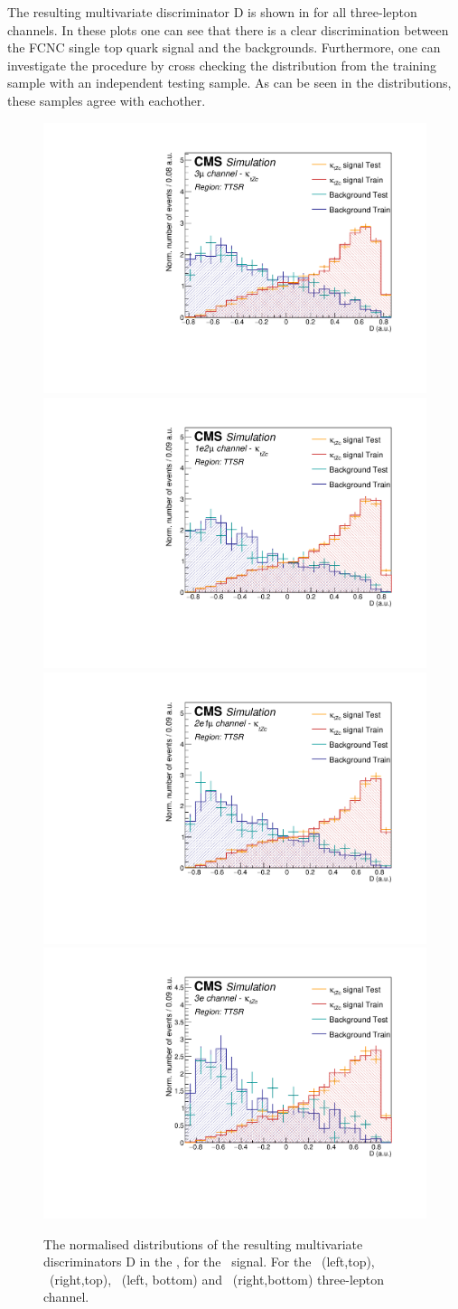 \clearpage

The resulting multivariate discriminator D is shown in  for all three-lepton channels. In these plots one can see that there is a clear discrimination between the FCNC single top quark signal and the backgrounds. Furthermore, one can investigate the procedure by cross checking the distribution from the training sample with an independent testing sample. As can be seen in the distributions, these samples agree with eachother.
\begin{figure}[htbp]
	\centering
	\includegraphics[width=0.49\linewidth]{6_Search/Figures/PlotsTechnics/SigVsBkgTestZcttoppairuuu}
	\includegraphics[width=0.49\linewidth]{6_Search/Figures/PlotsTechnics/SigVsBkgTestZcttoppairuue}
	\includegraphics[width=0.49\linewidth]{6_Search/Figures/PlotsTechnics/SigVsBkgTestZcttoppaireeu}
	\includegraphics[width=0.49\linewidth]{6_Search/Figures/PlotsTechnics/SigVsBkgTestZcttoppaireee}
	\caption{The normalised distributions of the resulting  multivariate discriminators D in the \TTSR, for the \Zct\ signal. For the \mumumu\ (left,top), \emumu\ (right,top), \eemu\ (left, bottom) and \eee\ (right,bottom) three-lepton channel.}
	\label{fig:sigvsbkgtestzcttoppaire}
\end{figure}

